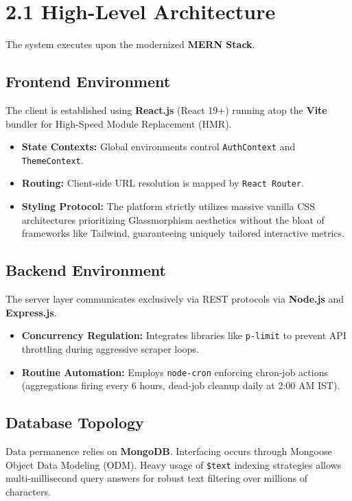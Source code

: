 \documentclass[12pt,a4paper,oneside]{report}
\begin{document}
\section{2.1 High-Level Architecture}
The system executes upon the modernized \textbf{MERN Stack}.

\subsection{Frontend Environment}
The client is established using \textbf{React.js} (React 19+) running atop the \textbf{Vite} bundler for High-Speed Module Replacement (HMR). 
\begin{itemize}
    \item \textbf{State Contexts:} Global environments control \texttt{AuthContext} and \texttt{ThemeContext}.
    \item \textbf{Routing:} Client-side URL resolution is mapped by \texttt{React Router}.
    \item \textbf{Styling Protocol:} The platform strictly utilizes massive vanilla CSS architectures prioritizing Glassmorphism aesthetics without the bloat of frameworks like Tailwind, guaranteeing uniquely tailored interactive metrics.
\end{itemize}

\subsection{Backend Environment}
The server layer communicates exclusively via REST protocols via \textbf{Node.js} and \textbf{Express.js}.
\begin{itemize}
    \item \textbf{Concurrency Regulation:} Integrates libraries like \texttt{p-limit} to prevent API throttling during aggressive scraper loops.
    \item \textbf{Routine Automation:} Employs \texttt{node-cron} enforcing chron-job actions (aggregations firing every 6 hours, dead-job cleanup daily at 2:00 AM IST).
\end{itemize}

\subsection{Database Topology}
Data permanence relies on \textbf{MongoDB}. Interfacing occurs through Mongoose Object Data Modeling (ODM). Heavy usage of \texttt{\$text} indexing strategies allows multi-millisecond query answers for robust text filtering over millions of characters.
\end{document}
